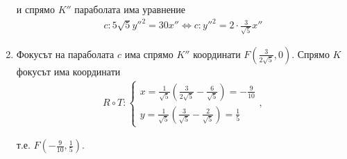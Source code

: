 \documentclass[numbers=endperiod, bibliography=totocnumbered]{scrartcl}
\begin{document}
\begin{solution}
\begin{enumerate}
    и спрямо \( K'' \) параболата има уравнение
    \begin{align*}
      c: 5 \sqrt 5 y''^2 = 30x''
      \iff
      c: y''^2 = 2 \cdot \frac 3 {\sqrt 5}x''
    \end{align*}

    \item Фокусът на параболата \( c \) има спрямо \( K'' \) координати \( F \left(\frac 3 {2 \sqrt 5}, 0 \right) \). Спрямо \( K \) фокусът има координати
    \begin{align*}
      R \circ T: \begin{cases}
        x = \frac 1 {\sqrt 5} \left( \frac 3 {2 \sqrt 5} - \frac 6 {\sqrt 5} \right) = - \frac 9 {10} \\
        y = \frac 1 {\sqrt 5} \left( \frac 3 {\sqrt 5} - \frac 2 {\sqrt 5} \right) = \frac 1 5
      \end{cases},
    \end{align*}

    т.е. \( F \left(-\frac 9 {10}, \frac 1 5 \right) \).
  \end{enumerate}
\end{solution}

\printbibliography
\end{document}
